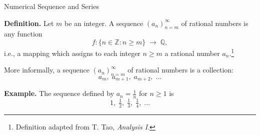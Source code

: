 \documentclass{beamer}
\begin{document}
\begin{frame}{Numerical Sequence and Series}

\textbf{Definition.} Let $m$ be an integer.  
A sequence $(a_n)_{n=m}^{\infty}$ of rational numbers is any function
\[
f: \{ n \in \mathbb{Z} : n \geq m \} \;\to\; \mathbb{Q},
\]
i.e., a mapping which assigns to each integer $n \geq m$ a rational number $a_n$.\footnote{Definition adapted from T. Tao, \emph{Analysis I}.}

\medskip
More informally, a sequence $(a_n)_{n=m}^{\infty}$ of rational numbers is a collection:
\[
a_m, \; a_{m+1}, \; a_{m+2}, \; \dots
\]

\bigskip
\textbf{Example.}  
The sequence defined by $a_n = \tfrac{1}{n}$ for $n \geq 1$ is
\[
1, \; \tfrac{1}{2}, \; \tfrac{1}{3}, \; \tfrac{1}{4}, \; \dots
\]

    
\end{frame}
\end{document}
